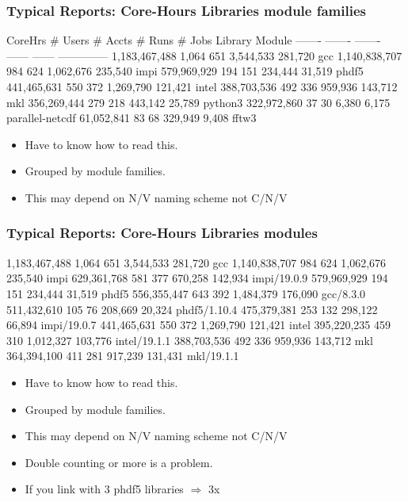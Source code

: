 \documentclass{beamer}
\begin{document}
\begin{frame}[fragile]
    \frametitle{Typical Reports: Core-Hours Libraries module families}
 {\tiny
    \begin{semiverbatim}
      CoreHrs  # Users  # Accts     # Runs  # Jobs   Library Module
      -------  -------  -------     ------  ------   --------------
1,183,467,488    1,064      651  3,544,533  281,720  gcc
1,140,838,707      984      624  1,062,676  235,540  impi
  579,969,929      194      151    234,444  31,519   phdf5
  441,465,631      550      372  1,269,790  121,421  intel
  388,703,536      492      336    959,936  143,712  mkl
  356,269,444      279      218    443,142  25,789   python3
  322,972,860       37       30      6,380  6,175    parallel-netcdf
   61,052,841       83       68    329,949  9,408    fftw3
  \end{semiverbatim}
}
  \begin{itemize}
    \item Have to know how to read this.
    \item Grouped by module families.
    \item This may depend on N/V naming scheme not C/N/V
  \end{itemize}
\end{frame}

\begin{frame}[fragile]
    \frametitle{Typical Reports: Core-Hours Libraries modules}
 {\tiny
  \begin{semiverbatim}
1,183,467,488    1,064      651  3,544,533  281,720  gcc
1,140,838,707      984      624  1,062,676  235,540  impi
  629,361,768      581      377    670,258  142,934  impi/19.0.9
  579,969,929      194      151    234,444  31,519   phdf5
  556,355,447      643      392  1,484,379  176,090  gcc/8.3.0
  511,432,610      105       76    208,669  20,324   phdf5/1.10.4
  475,379,381      253      132    298,122  66,894   impi/19.0.7
  441,465,631      550      372  1,269,790  121,421  intel
  395,220,235      459      310  1,012,327  103,776  intel/19.1.1
  388,703,536      492      336    959,936  143,712  mkl
  364,394,100      411      281    917,239  131,431  mkl/19.1.1
  \end{semiverbatim}
}
  \begin{itemize}
    \item Have to know how to read this.
    \item Grouped by module families.
    \item This may depend on N/V naming scheme not C/N/V
    \item Double counting or more is a problem.
    \item If you link with 3 phdf5 libraries $\Rightarrow$ 3x
  \end{itemize}
\end{frame}
\end{document}
